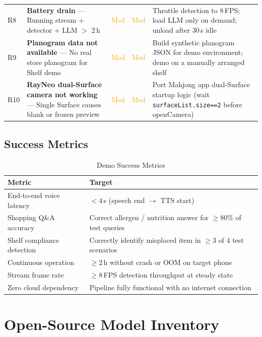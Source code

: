 \documentclass[11pt,a4paper]{article}
\begin{document}
\begin{longtable}{C{0.4cm} L{3.8cm} C{1.4cm} C{1.4cm} L{5.5cm}}
R8 & \textbf{Battery drain} — Running stream + detector + LLM $>$ 2\,h
  & \textcolor{orange}{Med}
  & \textcolor{orange}{Med}
  & Throttle detection to 8\,FPS; load LLM only on demand; unload after 30\,s idle \\

R9 & \textbf{Planogram data not available} — No real store planogram for Shelf demo
  & \textcolor{orange}{Med}
  & \textcolor{orange}{Med}
  & Build synthetic planogram JSON for demo environment; demo on a manually arranged shelf \\

R10 & \textbf{RayNeo dual-Surface camera not working} — Single Surface causes blank or frozen preview
  & \textcolor{orange}{Med}
  & \textcolor{orange}{Med}
  & Port Mahjong app dual-Surface startup logic (wait \texttt{surfaceList.size==2} before openCamera) \\

\end{longtable}

\subsection{Success Metrics}

\begin{table}[h!]
\centering
\renewcommand{\arraystretch}{1.3}
\begin{tabularx}{\textwidth}{L{4cm} X}
\toprule
\textbf{Metric} & \textbf{Target} \\
\midrule
End-to-end voice latency & $< 4$\,s (speech end $\rightarrow$ TTS start) \\
Shopping Q\&A accuracy   & Correct allergen / nutrition answer for $\geq 80\%$ of test queries \\
Shelf compliance detection & Correctly identify misplaced item in $\geq 3$ of 4 test scenarios \\
Continuous operation     & $\geq 2$\,h without crash or OOM on target phone \\
Stream frame rate        & $\geq 8$\,FPS detection throughput at steady state \\
Zero cloud dependency    & Pipeline fully functional with no internet connection \\
\bottomrule
\end{tabularx}
\caption{Demo Success Metrics}
\end{table}

\appendix
\section{Open-Source Model Inventory}
\end{document}
